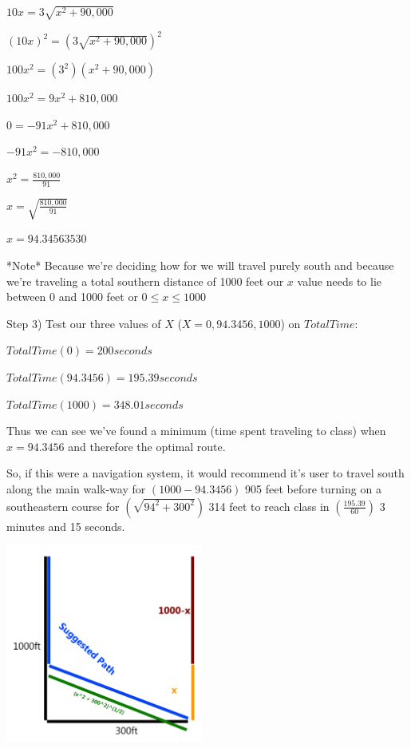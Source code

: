 \documentclass{article}
\begin{document}
$ 10x = 3\sqrt{x^2 + 90,000} $

$ (10x)^2 = (3\sqrt{x^2 + 90,000})^2 $

$ 100x^2 = (3^2) (x^2 + 90,000) $

$ 100x^2 = 9x^2 + 810,000 $

$ 0 = -91x^2 + 810,000 $

$ -91x^2 = -810,000 $

$ x^2 = \frac{810,000}{91} $

$ x = \sqrt{\frac{810,000}{91}} $

$ x = 94.34563530 $

\vspace{.5cm}
*Note* Because we're deciding how for we will travel purely south and because we're traveling a total southern distance of 1000 feet our $ x $ value needs to lie between 0 and 1000 feet or $ 0 \leq x \leq 1000 $

\vspace{.5cm}
Step 3) Test our three values of $ X $ ($ X = 0, 94.3456, 1000 $) on $ TotalTime $:

\vspace{.5cm}
$ TotalTime(0) = 200 seconds $

$ TotalTime(94.3456) = 195.39 seconds $

$ TotalTime(1000) = 348.01 seconds $

\vspace{.5cm}
Thus we can see we've found a minimum (time spent traveling to class) when $ x = 94.3456 $ and therefore the optimal route.

So, if this were a navigation system, it would recommend it's user to travel south along the main walk-way for $ (1000 - 94.3456) $ 905 feet before turning on a southeastern course for $ (\sqrt{94^2 + 300^2}) $ 314 feet to reach class in $ (\frac{195.39}{60}) $ 3 minutes and 15 seconds.

\centering
\includegraphics[width=6.5cm]{fig1}
\end{document}
